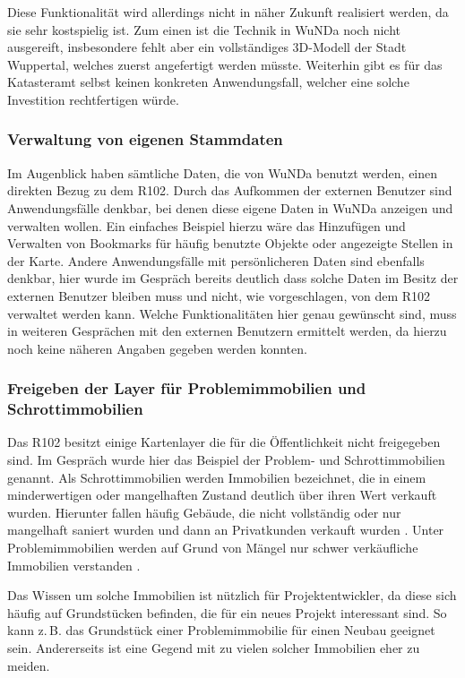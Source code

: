 Diese Funktionalität wird allerdings nicht in näher Zukunft realisiert werden, da sie sehr kostspielig ist.
Zum einen ist die Technik in \ac{WuNDa} noch nicht ausgereift, insbesondere fehlt aber ein vollständiges 3D-Modell der Stadt Wuppertal, welches zuerst angefertigt werden müsste.
Weiterhin gibt es für das Katasteramt selbst keinen konkreten Anwendungsfall, welcher eine solche Investition rechtfertigen würde.  

\subsubsection{Verwaltung von eigenen Stammdaten}
Im Augenblick haben sämtliche Daten, die von \ac{WuNDa} benutzt werden, einen direkten Bezug zu dem R102.
Durch das Aufkommen der externen Benutzer sind Anwendungsfälle denkbar, bei denen diese eigene Daten in \ac{WuNDa} anzeigen und verwalten wollen.
Ein einfaches Beispiel hierzu wäre das Hinzufügen und Verwalten von Bookmarks für häufig benutzte Objekte oder angezeigte Stellen in der Karte.
Andere Anwendungsfälle mit persönlicheren Daten sind ebenfalls denkbar, hier wurde im Gespräch bereits deutlich dass solche Daten im Besitz der externen Benutzer bleiben muss und nicht, wie vorgeschlagen, von dem R102 verwaltet werden kann.
Welche Funktionalitäten hier genau gewünscht sind, muss in weiteren Gesprächen mit den externen Benutzern ermittelt werden, da hierzu noch keine näheren Angaben gegeben werden konnten.
\subsubsection{Freigeben der Layer für Problemimmobilien und Schrottimmobilien}
Das R102 besitzt einige Kartenlayer die für die Öffentlichkeit nicht freigegeben sind.
Im Gespräch wurde hier das Beispiel der Problem- und Schrottimmobilien genannt.
Als Schrottimmobilien werden Immobilien bezeichnet, die in einem minderwertigen oder mangelhaften Zustand deutlich über ihren Wert verkauft wurden.
Hierunter fallen häufig Gebäude, die nicht vollständig oder nur mangelhaft saniert wurden und dann an Privatkunden verkauft wurden \autocite[vgl.][]{iva-schrottimmo}.
Unter Problemimmobilien werden auf Grund von Mängel nur schwer verkäufliche Immobilien verstanden \autocite[vgl.][]{immo-problemimmo}.

Das Wissen um solche Immobilien ist nützlich für Projektentwickler, da diese sich häufig auf Grundstücken befinden, die für ein neues Projekt interessant sind.
So kann z.\,B. das Grundstück einer Problemimmobilie für einen Neubau geeignet sein.
Andererseits ist eine Gegend mit zu vielen solcher Immobilien eher zu meiden.

